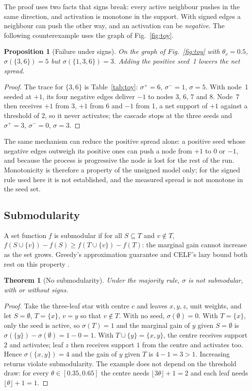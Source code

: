 \documentclass[journal,letterpaper,10pt]{IEEEtran}
\newtheorem{theorem}{Theorem}
\newtheorem{proposition}{Proposition}
\begin{document}
The proof uses two facts that signs break: every active neighbour pushes in the same direction, and activation is monotone in the support. With signed edges a neighbour can push the other way, and an activation can be \emph{negative}. The following counterexample uses the graph of Fig.~\ref{fig:toy}.

\begin{proposition}[Failure under signs]
On the graph of Fig.~\ref{fig:toy} with $\theta_v=0.5$, $\sigma(\{3,6\})=5$ but $\sigma(\{1,3,6\})=3$. Adding the positive seed~1 lowers the net spread.
\end{proposition}

\begin{proof}
The trace for $\{3,6\}$ is Table~\ref{tab:toy}: $\sigma^{+}=6$, $\sigma^{-}=1$, $\sigma=5$. With node~1 seeded at $+1$, its four negative edges deliver $-1$ to nodes 3, 6, 7 and 8. Node~7 then receives $+1$ from 3, $+1$ from 6 and $-1$ from 1, a net support of $+1$ against a threshold of $2$, so it never activates; the cascade stops at the three seeds and $\sigma^{+}=3$, $\sigma^{-}=0$, $\sigma=3$.
\end{proof}

The same mechanism can reduce the positive spread alone: a positive seed whose negative edges outweigh its positive ones can push a node from $+1$ to $0$ or $-1$, and because the process is progressive the node is lost for the rest of the run. Monotonicity is therefore a property of the unsigned model only; for the signed rule used here it is not established, and the measured spread is not monotone in the seed set.

\subsection{Submodularity}

A set function $f$ is submodular if for all $S\subseteq T$ and $v\notin T$, $f(S\cup\{v\})-f(S)\ge f(T\cup\{v\})-f(T)$: the marginal gain cannot increase as the set grows. Greedy's approximation guarantee and CELF's lazy bound both rest on this property \cite{kempe2003,leskovec2007}.

\begin{theorem}[No submodularity]
Under the majority rule, $\sigma$ is not submodular, with or without signs.
\end{theorem}

\begin{proof}
Take the three-leaf star with centre $c$ and leaves $x,y,z$, unit weights, and let $S=\emptyset$, $T=\{x\}$, $v=y$ so that $v\notin T$. With no seed, $\sigma(\emptyset)=0$. With $T=\{x\}$, only the seed is active, so $\sigma(T)=1$ and the marginal gain of $y$ given $S=\emptyset$ is $\sigma(\{y\})-\sigma(\emptyset)=1-0=1$. With $T\cup\{y\}=\{x,y\}$, the centre receives support $2$ and activates; leaf $z$ then receives support $1$ from the centre and activates too. Hence $\sigma(\{x,y\})=4$ and the gain of $y$ given $T$ is $4-1=3>1$. Increasing returns violate submodularity. The example does not depend on the threshold draw: for every $\theta\in[0.35,0.65]$ the centre needs $\lfloor3\theta\rfloor+1=2$ and each leaf needs $\lfloor\theta\rfloor+1=1$.
\end{proof}
\end{document}
